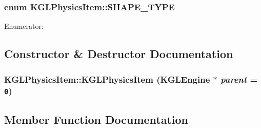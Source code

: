 \begin{CompactItemize}
{\subsubsection[{SHAPE\_\-TYPE}]{\setlength{\rightskip}{0pt plus 5cm}enum {\bf KGLPhysicsItem::SHAPE\_\-TYPE}}}
\label{class_k_g_l_physics_item_b74dbd1e43d8bc18ec4fc6c16d3d4b7c}


\begin{Desc}
\item[Enumerator: ]\par
\begin{description}
\item[{\em 
\hypertarget{class_k_g_l_physics_item_b74dbd1e43d8bc18ec4fc6c16d3d4b7c7f3449bf6512cac0a5dbf9aadc27b766}{
POLYGON\_\-SHAPE}
\label{class_k_g_l_physics_item_b74dbd1e43d8bc18ec4fc6c16d3d4b7c7f3449bf6512cac0a5dbf9aadc27b766}
}]\item[{\em 
\hypertarget{class_k_g_l_physics_item_b74dbd1e43d8bc18ec4fc6c16d3d4b7c6b578fc66c478353e0e41ca78583a1e8}{
CIRCLE\_\-SHAPE}
\label{class_k_g_l_physics_item_b74dbd1e43d8bc18ec4fc6c16d3d4b7c6b578fc66c478353e0e41ca78583a1e8}
}]\end{description}
\end{Desc}



\subsection{Constructor \& Destructor Documentation}
\hypertarget{class_k_g_l_physics_item_7930e195a22bd7e3b5809bd996cff4a4}{
\subsubsection[{KGLPhysicsItem}]{\setlength{\rightskip}{0pt plus 5cm}KGLPhysicsItem::KGLPhysicsItem ({\bf KGLEngine} $\ast$ {\em parent} = {\tt 0})}}
\label{class_k_g_l_physics_item_7930e195a22bd7e3b5809bd996cff4a4}




\subsection{Member Function Documentation}
\hypertarget{class_k_g_l_physics_item_faf0f2e3fd56195ce1e165b5f206855a}{
}
\end{CompactItemize}
